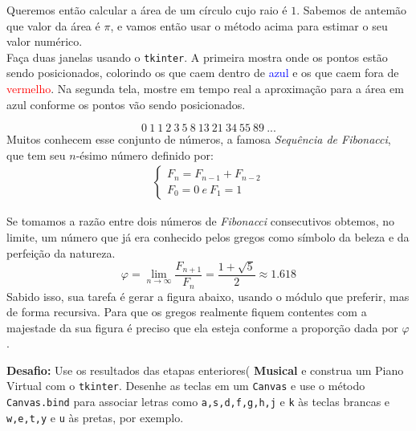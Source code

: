 \documentclass[12pt]{article}
\begin{document}
	Queremos então calcular a área de um círculo cujo raio é $1$. Sabemos de antemão que valor da área é $\pi$, e vamos então usar o método acima para estimar o seu valor numérico.\\

	Faça duas janelas usando o \texttt{tkinter}. A primeira mostra onde os pontos estão sendo posicionados, colorindo os que caem dentro de \textcolor{blue}{azul} e os que caem fora de \textcolor{red}{vermelho}. Na segunda tela, mostre em tempo real a aproximação para a área em azul conforme os pontos vão sendo posicionados. \\
	
	
	
	\[0\ 1\ 1\ 2\ 3\ 5\ 8\ 13\ 21\ 34\ 55\ 89\ ... \]	
	Muitos conhecem esse conjunto de números, a famosa \emph{Sequência de Fibonacci}, que tem seu $n$-ésimo número definido por:
	\begin{align*}
	\begin{cases}
	F_{n} = F_{n-1} + F_{n-2}\\
	F_{0} = 0 \ e \ F_{1} = 1
	\end{cases}
	\end{align*}
	
	Se tomamos a razão entre dois números de \emph{Fibonacci} consecutivos obtemos, no limite, um número que já era conhecido pelos gregos como símbolo da beleza e da perfeição da natureza.
	$$\varphi = \lim_{n \to \infty} \frac{F_{n+1}}{F_{n}}= \frac{1+\sqrt{5}}{2} \approx 1.618 $$
	Sabido isso, sua tarefa é gerar a figura abaixo, usando o módulo que preferir, mas de forma recursiva. Para que os gregos realmente fiquem contentes com a majestade da sua figura é preciso que ela esteja conforme a proporção dada por $\varphi$.
	
	
	
	\textbf{Desafio:} Use os resultados das etapas enteriores( \textbf{Musical} e construa um Piano Virtual com o \texttt{tkinter}. Desenhe as teclas em um \texttt{Canvas} e use o método \texttt{Canvas.bind} para associar letras como \texttt{a,s,d,f,g,h,j} e \texttt{k} às teclas brancas e \texttt{w,e,t,y} e \texttt{u} às pretas, por exemplo.

\end{document}
